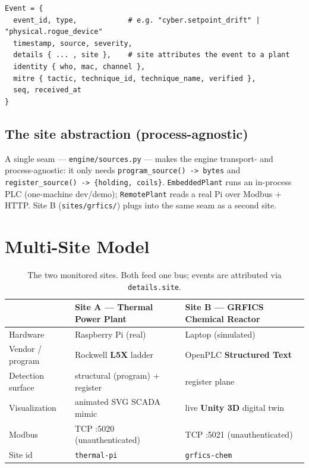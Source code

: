 \documentclass[11pt,a4paper]{article}
\newcommand{\code}[1]{\texttt{\small #1}}
\begin{document}
\begin{lstlisting}
Event = {
  event_id, type,            # e.g. "cyber.setpoint_drift" | "physical.rogue_device"
  timestamp, source, severity,
  details { ... , site },    # site attributes the event to a plant
  identity { who, mac, channel },
  mitre { tactic, technique_id, technique_name, verified },
  seq, received_at
}
\end{lstlisting}

\subsection{The site abstraction (process-agnostic)}
A single seam --- \code{engine/sources.py} --- makes the engine transport- and process-agnostic:
it only needs \code{program\_source() -> bytes} and \code{register\_source() -> \{holding, coils\}}.
\code{EmbeddedPlant} runs an in-process PLC (one-machine dev/demo); \code{RemotePlant} reads a real
Pi over Modbus + HTTP. Site B (\code{sites/grfics/}) plugs into the same seam as a second site.

\section{Multi-Site Model}
\begin{table}[h]\small
\centering
\renewcommand{\arraystretch}{1.25}
\begin{tabularx}{\textwidth}{@{}l L L@{}}
\toprule
 & \textbf{Site A — Thermal Power Plant} & \textbf{Site B — GRFICS Chemical Reactor}\\
\midrule
Hardware & Raspberry Pi (real) & Laptop (simulated) \\
Vendor / program & Rockwell \textbf{L5X} ladder & OpenPLC \textbf{Structured Text} \\
Detection surface & structural (program) + register & register plane \\
Visualization & animated SVG SCADA mimic & live \textbf{Unity 3D} digital twin \\
Modbus & TCP :5020 (unauthenticated) & TCP :5021 (unauthenticated) \\
Site id & \code{thermal-pi} & \code{grfics-chem} \\
\bottomrule
\end{tabularx}
\caption{The two monitored sites. Both feed one bus; events are attributed via \code{details.site}.}
\end{table}
\end{document}
